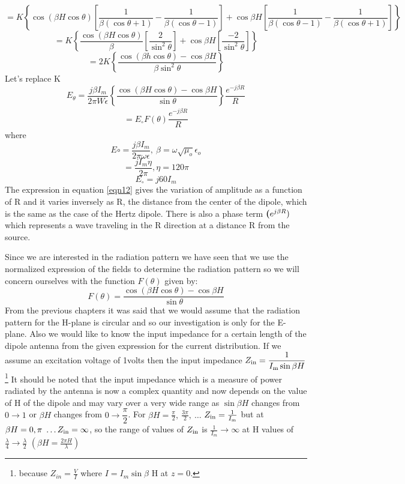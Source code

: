 \begin{dmath*}
=K\left\lbrace\cos(\beta H\cos \theta)\left[\dfrac{1}{\beta(\cos \theta + 1)}- \dfrac{1}{\beta(\cos\theta - 1)}\right] + \cos \beta H\left[\dfrac{1}{\beta(\cos\theta  - 1)} - \dfrac{1}{\beta(\cos\theta + 1)}\right]\right\rbrace
\end{dmath*}
$$=K\left\lbrace\dfrac{\cos(\beta H\cos \theta)}{\beta} \left[\dfrac{2}{\sin^{2}\theta}\right] + \cos \beta H\left[\dfrac{-2}{\sin^{2}\theta}\right] \right\rbrace$$
$$=2K \left\lbrace\dfrac{\cos(\beta h\cos\theta) - \cos\beta H}{\beta\sin^{2}\theta}\right\rbrace$$
Let's replace K
$$E_{\theta} = \dfrac{j\beta I_m}{2\pi W\epsilon}\left\{\dfrac{\cos(\beta H\cos \theta)- \cos \beta H}{\sin\theta}\right\} \dfrac{e^{-j\beta R}}{R}$$
\begin{align}
=E_\circ F(\theta) \dfrac{e^{-j\beta R}}{R}
\label{eqn12}
\end{align}
where $$E\circ= \dfrac{j\beta I_m}{2\pi \omega\epsilon} ,\ \beta=\omega\sqrt{\mu_o} \epsilon_o$$ 
$$ =\dfrac{jI_m\eta}{2\pi}, \eta =120\pi$$
$$E_\circ= j60I_m $$
The expression in equation \ref{eqn12} gives the variation of amplitude as a function of R and it varies inversely as R, the distance from the center of the dipole, which is the same as the case of the Hertz dipole. There is also a phase term $\textbf(e^{j\beta R})$ which represents a wave traveling in the R direction at a distance R from the source.

Since we are interested in the radiation pattern we have seen that we use the normalized expression of the fields to determine the radiation pattern so we will concern ourselves with the function $F(\theta)$ given by:
$$F(\theta) = \dfrac{\cos(\beta H\cos\theta) - \cos \beta H}{\sin \theta}$$
From the previous chapters  it was said that we would assume that the radiation pattern for the H-plane is circular and so our investigation is only for the E-plane. Also we would like to know the input impedance for a certain length of the dipole antenna from the given expression for the current distribution. If we assume an excitation voltage of 1volts then the input impedance $Z_{\textnormal{in}} = \dfrac{1}{I_{\textnormal{m}} \sin \beta H}$\footnote{because $Z_{in}=\frac{V}{I}$ where $I = I_m\sin\beta$ H at $z= 0$.}
It should be noted that the input impedance which is a measure of power radiated by the antenna is now a complex quantity and now depends on the value of H of the dipole and may vary over a very wide range as $\sin \beta H$ changes from $0 \rightarrow 1$ or $\beta H$ changes from $0\rightarrow\dfrac{\pi}{2}$. For $\beta H = \frac{\pi}{2},\ \frac{3\pi}{2},\ \ldots$ $Z_{\textnormal{in}}=\frac{1}{I_{\textnormal{m}}}$ but at $\beta H = 0, \pi\ \ldots Z_{\textnormal{in}} =\infty$, so the range of values of $Z_{\textnormal{in}}$ is ${\frac{1}{I_m}}\rightarrow \infty$ at H values of ${\frac{\lambda}{4}} \rightarrow \frac{\lambda}{2}$ $(\beta H = \frac{2 \pi H}{\lambda})$

